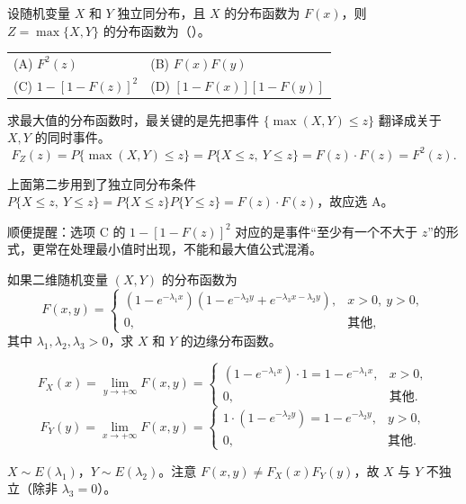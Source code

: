 ﻿\documentclass[lang=cn,11pt]{elegantbook}
\begin{document}
\begin{exercise} \label{exer:3-c3}
设随机变量 $X$ 和 $Y$ 独立同分布，且 $X$ 的分布函数为 $F(x)$，则 $Z = \max\{X,Y\}$ 的分布函数为（\quad）。
\begin{tabular}{ll}
(A) $F^2(z)$ & (B) $F(x)F(y)$ \\
(C) $1-[1-F(z)]^2$ & (D) $[1-F(x)][1-F(y)]$
\end{tabular}
\end{exercise}
\begin{solution}
求最大值的分布函数时，最关键的是先把事件 \(\{\max(X,Y)\le z\}\) 翻译成关于 \(X,Y\) 的同时事件。
\[
F_Z(z) = P\{\max(X,Y) \leqslant z\} = P\{X \leqslant z,\ Y \leqslant z\} = F(z) \cdot F(z) = F^2(z).
\]

上面第二步用到了独立同分布条件 \(P\{X\le z,\ Y\le z\}=P\{X\le z\}P\{Y\le z\}=F(z)\cdot F(z)\)，故应选 A。

顺便提醒：选项 C 的 \(1-[1-F(z)]^2\) 对应的是事件“至少有一个不大于 \(z\)”的形式，更常在处理最小值时出现，不能和最大值公式混淆。
\end{solution}



\begin{exercise}[边缘分布函数] \label{exer:3-c4}
如果二维随机变量 $(X,Y)$ 的分布函数为
\[
F(x,y) = \begin{cases} (1-e^{-\lambda_1 x})(1-e^{-\lambda_2 y} + e^{-\lambda_3 x-\lambda_2 y}), & x > 0,\ y > 0, \\ 0, & \text{其他}, \end{cases}
\]
其中 $\lambda_1, \lambda_2, \lambda_3 > 0$，求 $X$ 和 $Y$ 的边缘分布函数。
\end{exercise}
\begin{solution}
\[
F_X(x) = \lim_{y\to+\infty}F(x,y) = \begin{cases} (1-e^{-\lambda_1 x})\cdot 1 = 1-e^{-\lambda_1 x}, & x > 0, \\ 0, & \text{其他}. \end{cases}
\]
\[
F_Y(y) = \lim_{x\to+\infty}F(x,y) = \begin{cases} 1\cdot(1-e^{-\lambda_2 y}) = 1-e^{-\lambda_2 y}, & y > 0, \\ 0, & \text{其他}. \end{cases}
\]
\begin{note}
$X \sim E(\lambda_1)$，$Y \sim E(\lambda_2)$。注意 $F(x,y) \neq F_X(x)F_Y(y)$，故 $X$ 与 $Y$ 不独立（除非 $\lambda_3 = 0$）。
\end{note}
\end{solution}
\end{document}
